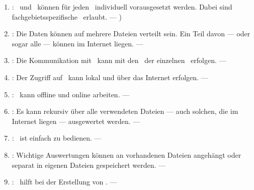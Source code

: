 \begin{enumerate}
	\item \label{Anforderung-Individualitaet} :
	\Axiome\ und \Saetze\ können für jeden \Beweis\ individuell vorausgesetzt werden.
	Dabei sind fachgebietsspezifische \Fachbegriffe\ erlaubt.
	--- )

	\item \label{Anforderung-Internet} :
	Die Daten können auf mehrere Dateien verteilt sein.
	Ein Teil davon --- oder sogar alle --- können im Internet liegen.
	--- 

	\item \label{Anforderung-Kommunikation} :
	Die Kommunikation mit \ASBA\ kann mit den \Fachbegriffen\ der einzelnen \Teilgebiete\ erfolgen.
	--- 

	\item \label{Anforderung-Zugriff} :
	Der Zugriff auf \ASBA\ kann lokal und über das Internet erfolgen.
	--- 

	\item \label{Anforderung-Unabhaengigkeit} :
	\ASBA\ kann offline und online arbeiten.
	--- 

	\item \label{Anforderung-Rekursion} :
	Es kann rekursiv über alle verwendeten Dateien --- auch solchen, die im Internet liegen --- ausgewertet werden.
	--- 

	\item \label{Anforderung-Bedienbarkeit} :
	\ASBA\ ist einfach zu bedienen.
	--- 

	\item \label{Anforderung-Zwischenspeicher} :
	Wichtige Auswertungen können an vorhandenen Dateien angehängt oder separat in eigenen Dateien gespeichert werden.
	--- 

	\item \label{Anforderung-Beweisunterstuetzung} :
	\ASBA\ hilft bei der Erstellung von \Beweisen.
	--- 

\end{enumerate}

\section[Axiome]{\Axiome}%
\beginsection   {\Axiome}
\label       {sec-Axiome}

